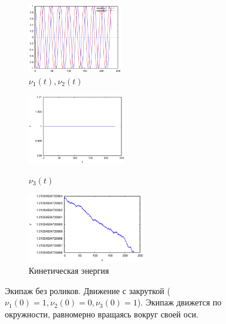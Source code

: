 \begin{figure}
    \begin{subfigure}[t]{0.3\textwidth}
        \centering
        \includegraphics[width=\linewidth, height=30mm]{pic/_old_sol__1_0_1__0__230__1e2_nu12}
        \caption{$\nu_1(t), \nu_2(t)$}
        \label{fig:_old_sol__1_0_1__0__230__1e2_nu12}    
    \end{subfigure}
    \hfill
    \begin{subfigure}[t]{0.3\textwidth}
        \centering
        \includegraphics[width=\linewidth, height=30mm]{pic/_old_sol__1_0_1__0__230__1e2_nu3} \\
        \caption{$\nu_3(t)$}
        \label{fig:_old_sol__1_0_1__0__230__1e2_nu3}
    \end{subfigure}
    \hfill
    \begin{subfigure}[t]{0.3\textwidth}
        \centering
        \includegraphics[width=\linewidth, height=30mm]{pic/_old_sol__1_0_1__0__230__1e2_kin_en}
        \caption{Кинетическая энергия}
        \label{fig:_old_sol__1_0_1__0__230__1e2_kin_en}
    \end{subfigure}
    
    \caption{Экипаж без роликов. Движение с закруткой ($\nu_1(0) = 1, \nu_2(0) = 0, \nu_3(0) = 1$). Экипаж движется по окружности, равномерно вращаясь вокруг своей оси.}
    \label{fig:old_wrench}
\end{figure}
